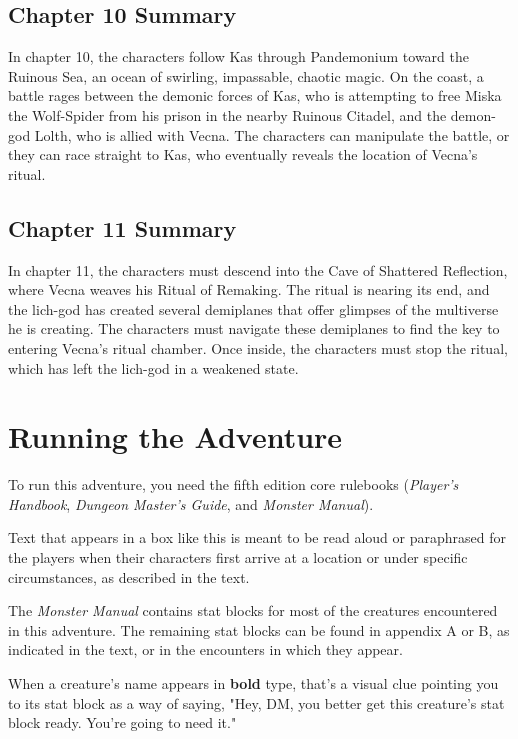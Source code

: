 \documentclass[10pt,a4paper,twoside,bg=print,twocolumn,openany,nodeprecatedcode]{dndbook}
\begin{document}
\subsection{Chapter 10 Summary}
In chapter 10, the characters follow Kas through Pandemonium toward the Ruinous Sea, an ocean of swirling, impassable, chaotic magic. On the coast, a battle rages between the demonic forces of Kas, who is attempting to free Miska the Wolf-Spider from his prison in the nearby Ruinous Citadel, and the demon-god Lolth, who is allied with Vecna. The characters can manipulate the battle, or they can race straight to Kas, who eventually reveals the location of Vecna's ritual.

\subsection{Chapter 11 Summary}
In chapter 11, the characters must descend into the Cave of Shattered Reflection, where Vecna weaves his Ritual of Remaking. The ritual is nearing its end, and the lich-god has created several demiplanes that offer glimpses of the multiverse he is creating. The characters must navigate these demiplanes to find the key to entering Vecna's ritual chamber. Once inside, the characters must stop the ritual, which has left the lich-god in a weakened state.

\section{Running the Adventure}
To run this adventure, you need the fifth edition core rulebooks (\textit{Player's Handbook}, \textit{Dungeon Master's Guide}, and \textit{Monster Manual}).

\begin{DndReadAloud}{}
Text that appears in a box like this is meant to be read aloud or paraphrased for the players when their characters first arrive at a location or under specific circumstances, as described in the text.

\end{DndReadAloud}

The \textit{Monster Manual} contains stat blocks for most of the creatures encountered in this adventure. The remaining stat blocks can be found in appendix A or B, as indicated in the text, or in the encounters in which they appear.

When a creature's name appears in \textbf{bold} type, that's a visual clue pointing you to its stat block as a way of saying, "Hey, DM, you better get this creature's stat block ready. You're going to need it."
\end{document}
